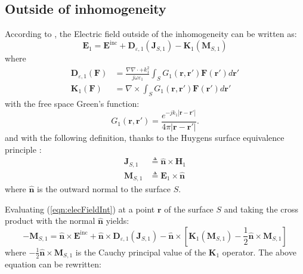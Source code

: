 \documentclass[a4paper,10pt]{book}
\newcommand{\field}[1]{\mathbf{#1}}
\newcommand{\current}[1]{\mathbf{#1}}
\newcommand{\vect}[1]{\mathbf{#1}}
\newcommand{\operator}[1]{\mathbf{#1}}
\begin{document}
\subsection{Outside of inhomogeneity}

%
\par
According to \cite{Ides2006}, the Electric field outside of the inhomogeneity can be written as:
\begin{equation}\label{eqn:elecFieldInt}
\field{E}_1 = \field{E}^\text{inc} + \operator{D}_{\varepsilon, 1}\left(\current{J}_{S,1}\right) - \operator{K}_{1}\left(\current{M}_{S,1}\right)
\end{equation}
where
\begin{align*}
\operator{D}_{\varepsilon, 1}\left(\current{F}\right) &= \frac{\nabla \nabla \cdot + k_1^2}{j \omega \varepsilon_1} \int_S G_1(\vect{r}, \vect{r}') \current{F}\left(\vect{r}'\right) d\vect{r}' \\
\operator{K}_{1}\left(\current{F}\right) &= \nabla \times \int_S G_1(\vect{r}, \vect{r}') \current{F}\left(\vect{r}'\right) d\vect{r}'
\end{align*}
with the free space Green's function:
\begin{equation*}
G_1(\vect{r}, \vect{r}') = \frac{e^{-jk_1 \left|\vect{r} - \vect{r}'  \right|}}{4 \pi \left|\vect{r} - \vect{r}'  \right|}.
\end{equation*}
and with the following definition, thanks to the Huygens surface equivalence principle \cite{Ides2006}:
\begin{align}
\current{J}_{S,1} &\triangleq \vect{\hat{n}} \times \field{H}_1 \\
\current{M}_{S,1} &\triangleq \field{E}_1 \times \vect{\hat{n}} 
\end{align}
where $\vect{\hat{n}}$ is the outward normal to the surface $S$. 
%
\par
Evaluating (\ref{eqn:elecFieldInt}) at a point $\vect{r}$ of the surface $S$ and taking the cross product with the normal $\vect{\hat{n}}$ yields:
\begin{equation}
-\current{M}_{S,1} = \vect{\hat{n}}\times \field{E}^\text{inc} + \vect{\hat{n}}\times \operator{D}_{\varepsilon, 1}\left(\current{J}_{S,1}\right) - \vect{\hat{n}}\times \left[\operator{K}_{1}\left(\current{M}_{S,1}\right) - \frac{1}{2}\vect{\hat{n}}\times \current{M}_{S,1} \right]
\end{equation}
where $-\frac{1}{2}\vect{\hat{n}}\times \current{M}_{S,1}$ is the Cauchy principal value of the $\operator{K}_1$ operator. The above equation can be rewritten:
\end{document}
